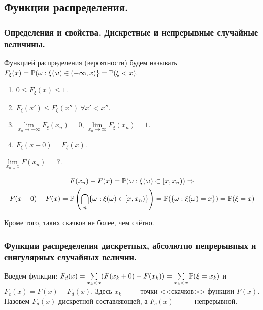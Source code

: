\subsection{Функции распределения.}
\subsubsection{Определения и свойства. Дискретные и непрерывные случайные величины.}
\begin{definition}
    Функцией распределения (вероятности) будем называть $F_\xi(x) = \P(\omega : \xi(\omega) \in (-\infty, x) \} = \P(\xi < x).$
\end{definition}
\begin{properties}
    \begin{enumerate}
        \item $0 \le F_\xi(x) \le 1$.
        \item $F_\xi(x') \le F_\xi(x'') \ \forall x' < x''$.
        \item $\lim\limits_{x_n \rightarrow -\infty} F_\xi(x_n) = 0$, $\lim\limits_{x_n \rightarrow \infty} F_{\xi}(x_n) = 1$.
        \item $F_{\xi}(x - 0) = F_{\xi}(x)$.
    \end{enumerate}
\end{properties}
\begin{problem}
    $\lim\limits_{x_n \downarrow x} F(x_n) = \ ?$.
\end{problem}
\begin{solution}
    \begin{gather*}
        F(x_n) - F(x) = \P(\omega : \xi(\omega) \subset [x, x_n)) \Rightarrow \\
        F(x + 0) - F(x) = \P\left(\bigcap_{n} \{\omega : \xi(\omega) \in [x, x_n)\}\right) = \P(\{\omega : \xi(\omega) = x\}) = \P(\xi = x)
    \end{gather*}
    
    Кроме того, таких скачков не более, чем счётно. 
\end{solution}
\subsubsection{Функции распределения дискретных, абсолютно непрерывных и сингулярных случайных величин.}
\begin{definition}
    Введем функции: $F_d(x) = \sum\limits_{x_k < x}(F(x_k + 0) - F(x_k)) = \sum\limits_{x_k < x}\P(\xi = x_k)$ и $F_c(x) = F(x) - F_d(x)$. Здесь $x_k$ ~---~ точки <<скачков>> функции $F(x)$. Назовем $F_d(x)$ дискретной составляющей, а $F_c(x)$ ~----~ непрерывной. 
\end{definition}

